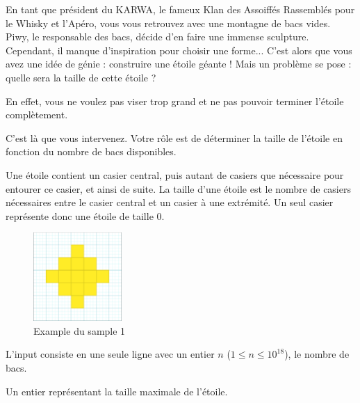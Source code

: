\problemname{}


En tant que président du KARWA, le fameux Klan des Assoiffés Rassemblés pour le Whisky et l'Apéro, vous vous retrouvez avec une montagne de bacs vides. Piwy, le responsable des bacs, décide d'en faire une immense sculpture. Cependant, il manque d'inspiration pour choisir une forme... 
C'est alors que vous avez une idée de génie : construire une étoile géante ! Mais un problème se pose : quelle sera la taille de cette étoile ?

En effet, vous ne voulez pas viser trop grand et ne pas pouvoir terminer l'étoile complètement.

C'est là que vous intervenez. Votre rôle est de déterminer la taille de l'étoile en fonction du nombre de bacs disponibles.

Une étoile contient un casier central, puis autant de casiers que nécessaire pour entourer ce casier, et ainsi de suite. La taille d'une étoile est le nombre de casiers nécessaires entre le casier central et un casier à une extrémité. Un seul casier représente donc une étoile de taille $0$.

\smallskip
\begin{figure}[h]
    \centering
    \includegraphics[width=0.3\textwidth]{example.png}
    \caption{Example du sample 1}
\end{figure}

\begin{Input}
    L'input consiste en une seule ligne avec un entier $n$ ($1 \leq n \leq 10^{18}$), le nombre de bacs.
\end{Input}

\begin{Output}
    Un entier représentant la taille maximale de l'étoile.
\end{Output}

